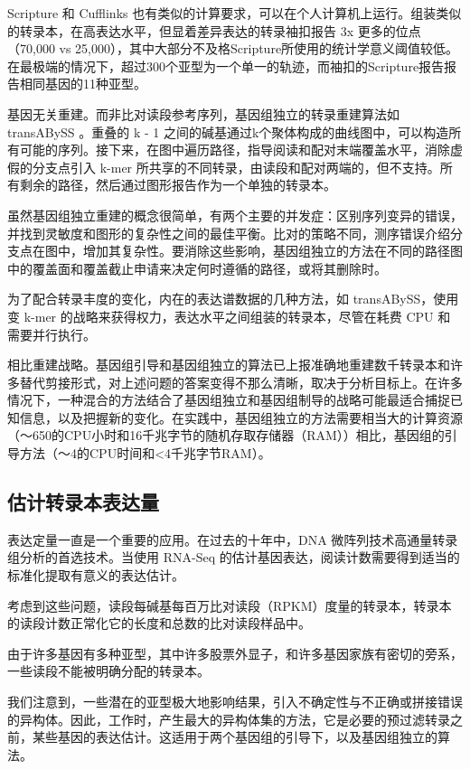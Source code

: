 Scripture 和 Cufflinks 也有类似的计算要求，可以在个人计算机上运行。组装类似的转录本，在高表达水平，但显着差异表达的转录袖扣报告 3x 更多的位点（70,000 vs 25,000），其中大部分不及格Scripture所使用的统计学意义阈值较低。在最极端的情况下，超过300个亚型为一个单一的轨迹，而袖扣的Scripture报告报告相同基因的11种亚型。

基因无关重建。而非比对读段参考序列，基因组独立的转录重建算法如 transABySS 。重叠的 k  -  1 之间的碱基通过k个聚体构成的曲线图中，可以构造所有可能的序列。接下来，在图中遍历路径，指导阅读和配对末端覆盖水平，消除虚假的分支点引入 k-mer 所共享的不同转录，由读段和配对两端的，但不支持。所有剩余的路径，然后通过图形报告​​作为一个单独的转录本。

虽然基因组独立重建的概念很简单，有两个主要的并发症：区别序列变异的错误，并找到灵敏度和图形的复杂性之间的最佳平衡。比对的策略不同，测序错误介绍分支点在图中，增加其复杂性。要消除这些影响，基因组独立的方法在不同的路径图中的覆盖面和覆盖截止申请来决定何时遵循的路径，或将其删除时。

为了配合转录丰度的变化，内在的表达谱数据的几种方法，如 transABySS，使用变 k-mer 的战略来获得权力，表达水平之间组装的转录本，尽管在耗费 CPU 和需要并行执行。

相比重建战略。基因组引导和基因组独立的算法已上报准确地重建数千转录本和许多替代剪接形式，对上述问题的答案变得不那么清晰，取决于分析目标上。在许多情况下，一种混合​​的方法结合了基因组独立和基因组制导的战略可能最适合捕捉已知信息，以及把握新的变化。在实践中，基因组独立的方法需要相当大的计算资源（〜650的CPU小时和16千兆字节的随机存取存储器（RAM））相比，基因组的引导方法（〜4的CPU时间和<4千兆字节RAM）。

\subsection{估计转录本表达量}

表达定量一直是一个重要的应用。在过去的十年中，DNA 微阵列技术高通量转录组分析的首选技术。当使用 RNA-Seq 的估计基因表达，阅读计数需要得到适当的标准化提取有意义的表达估计。

考虑到这些问题，读段每碱基每百万比对读段（RPKM）度量的转录本，转录本的读段计数正常化它的长度和总数的比对读段样品中。

由于许多基因有多种亚型，其中许多股票外显子，和许多基因家族有密切的旁系，一些读段不能被明确分配的转录本。

我们注意到，一些潜在的亚型极大地影响结果，引入不确定性与不正确或拼接错误的异构体。因此，工作时，产生最大的异构体集的方法，它是必要的预过滤转录之前，某些基因的表达估计。这适用于两个基因组的引导下，以及基因组独立的算法。


